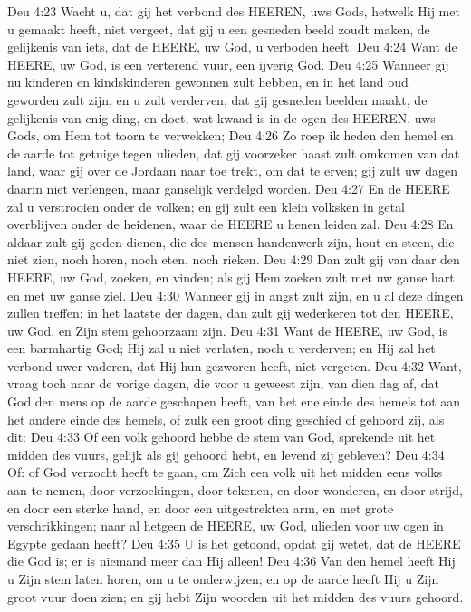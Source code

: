Deu 4:23  Wacht u, dat gij het verbond des HEEREN, uws Gods, hetwelk Hij met u gemaakt heeft, niet vergeet, dat gij u een gesneden beeld zoudt maken, de gelijkenis van iets, dat de HEERE, uw God, u verboden heeft.
Deu 4:24  Want de HEERE, uw God, is een verterend vuur, een ijverig God.
Deu 4:25  Wanneer gij nu kinderen en kindskinderen gewonnen zult hebben, en in het land oud geworden zult zijn, en u zult verderven, dat gij gesneden beelden maakt, de gelijkenis van enig ding, en doet, wat kwaad is in de ogen des HEEREN, uws Gods, om Hem tot toorn te verwekken;
Deu 4:26  Zo roep ik heden den hemel en de aarde tot getuige tegen ulieden, dat gij voorzeker haast zult omkomen van dat land, waar gij over de Jordaan naar toe trekt, om dat te erven; gij zult uw dagen daarin niet verlengen, maar ganselijk verdelgd worden.
Deu 4:27  En de HEERE zal u verstrooien onder de volken; en gij zult een klein volksken in getal overblijven onder de heidenen, waar de HEERE u henen leiden zal.
Deu 4:28  En aldaar zult gij goden dienen, die des mensen handenwerk zijn, hout en steen, die niet zien, noch horen, noch eten, noch rieken.
Deu 4:29  Dan zult gij van daar den HEERE, uw God, zoeken, en vinden; als gij Hem zoeken zult met uw ganse hart en met uw ganse ziel.
Deu 4:30  Wanneer gij in angst zult zijn, en u al deze dingen zullen treffen; in het laatste der dagen, dan zult gij wederkeren tot den HEERE, uw God, en Zijn stem gehoorzaam zijn.
Deu 4:31  Want de HEERE, uw God, is een barmhartig God; Hij zal u niet verlaten, noch u verderven; en Hij zal het verbond uwer vaderen, dat Hij hun gezworen heeft, niet vergeten.
Deu 4:32  Want, vraag toch naar de vorige dagen, die voor u geweest zijn, van dien dag af, dat God den mens op de aarde geschapen heeft, van het ene einde des hemels tot aan het andere einde des hemels, of zulk een groot ding geschied of gehoord zij, als dit:
Deu 4:33  Of een volk gehoord hebbe de stem van God, sprekende uit het midden des vuurs, gelijk als gij gehoord hebt, en levend zij gebleven?
Deu 4:34  Of: of God verzocht heeft te gaan, om Zich een volk uit het midden eens volks aan te nemen, door verzoekingen, door tekenen, en door wonderen, en door strijd, en door een sterke hand, en door een uitgestrekten arm, en met grote verschrikkingen; naar al hetgeen de HEERE, uw God, ulieden voor uw ogen in Egypte gedaan heeft?
Deu 4:35  U is het getoond, opdat gij wetet, dat de HEERE die God is; er is niemand meer dan Hij alleen!
Deu 4:36  Van den hemel heeft Hij u Zijn stem laten horen, om u te onderwijzen; en op de aarde heeft Hij u Zijn groot vuur doen zien; en gij hebt Zijn woorden uit het midden des vuurs gehoord.
